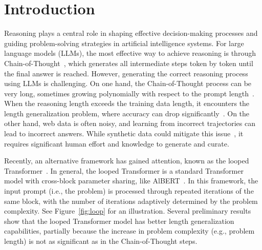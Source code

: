 \section{Introduction}
Reasoning plays a central role in shaping effective decision-making processes and guiding problem-solving strategies in artificial intelligence systems. For large language models (LLMs), the most effective way to achieve reasoning is through Chain-of-Thought~\cite{wei2022chain,khot2022decomposed}, which generates all intermediate steps token by token until the final answer is reached. However, generating the correct reasoning process using LLMs is challenging. On one hand, the Chain-of-Thought process can be very long, sometimes growing polynomially with respect to the prompt length~\cite{feng2024towards,merrill2024the}. When the reasoning length exceeds the training data length, it encounters the length generalization problem, where accuracy can drop significantly~\cite{xiao2023conditions,jin-etal-2024-impact}. On the other hand, web data is often noisy, and learning from incorrect trajectories can lead to incorrect answers. While synthetic data could mitigate this issue~\cite{lightman2024lets}, it requires significant human effort and knowledge to generate and curate. 

Recently, an alternative framework has gained attention, known as the looped Transformer~\cite{giannou2023looped}. In general, the looped Transformer is a standard Transformer model with cross-block parameter sharing, like AlBERT~\cite{lan2020albert}. In this framework, the input prompt (i.e., the problem) is processed through repeated iterations of the same block, with the number of iterations adaptively determined by the problem complexity. See Figure~\ref{fig:loop} for an illustration. Several preliminary results~\cite{fan2024looped} show that the looped Transformer model has better length generalization capabilities, partially because the increase in problem complexity (e.g., problem length) is not as significant as in the Chain-of-Thought steps. 

%     

